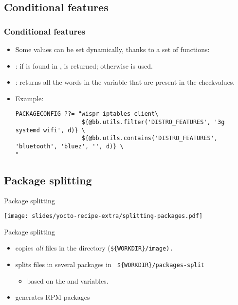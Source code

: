 \subsection{Conditional features}

\begin{frame}[fragile]
  \frametitle{Conditional features}
  \begin{itemize}
    \item Some values can be set dynamically, thanks to a set of
      functions:
    \item {}: if  is found in
      ,  is returned; otherwise
       is used.
    \item {}: returns
      all the words in the variable that are present in the
      checkvalues.
    \item Example:
      \begin{block}{}
      \fontsize{9}{9}\selectfont
      \begin{verbatim}
PACKAGECONFIG ??= "wispr iptables client\
                   ${@bb.utils.filter('DISTRO_FEATURES', '3g systemd wifi', d)} \
                   ${@bb.utils.contains('DISTRO_FEATURES', 'bluetooth', 'bluez', '', d)} \
"
      \end{verbatim}
      \end{block}
  \end{itemize}
\end{frame}

\subsection{Package splitting}

\begin{frame}{Package splitting}
  \begin{center}
    \texttt{[image: slides/yocto-recipe-extra/splitting-packages.pdf]}
  \end{center}
\end{frame}

\begin{frame}{Package splitting}
  \begin{itemize}
    \item {} copies {\em all} files in the  directory
      (\tt \$\{WORKDIR\}/image).
    \item {} splits files in several packages in \tt
      \$\{WORKDIR\}/packages-split
      \begin{itemize}
        \item based on the \code{PACKAGES} and \code{FILES} variables.
      \end{itemize}
    \item {} generates RPM packages
  \end{itemize}
\end{frame}

